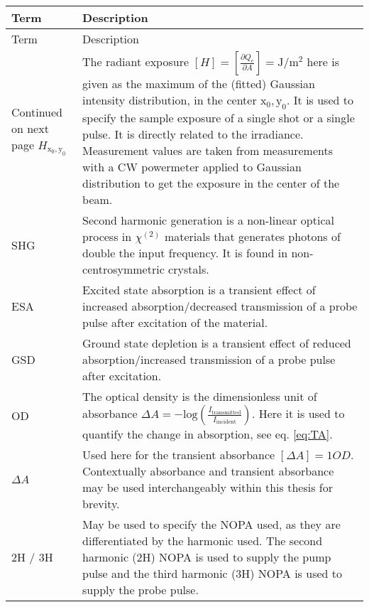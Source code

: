 \documentclass[twoside,openright,listof=numbered]{scrreprt}
\def\radiantExp{\ensuremath{H_\mathrm{x_0,y_0}}}
\begin{document}
\begin{longtable}{p{}p{}}
    \toprule 
    Term & Description \\
    \midrule
    \endfirsthead
    \toprule 
    Term & Description \\
    \midrule
    \endhead
    \midrule
    Continued on next page
    \endfoot
    \bottomrule
    \endlastfoot
\radiantExp & The radiant exposure $[H] = [\frac{\partial Q_e}{\partial A}] = \si{\joule\per\square\meter}$ here is given as the maximum of the (fitted) Gaussian intensity distribution, in the center $\mathrm{x_0,y_0}$. It is used to specify the sample exposure of a single shot or a single pulse. It is directly related to the irradiance. Measurement values are taken from measurements with a CW powermeter applied to Gaussian distribution to get the exposure in the center of the beam.\\
SHG & Second harmonic generation is a non-linear optical process in $\chi^{\left(2\right)}$ materials that generates photons of double the input frequency. It is found in non-centrosymmetric crystals.\\
ESA & Excited state absorption is a transient effect of increased absorption/decreased transmission of a probe pulse after excitation of the material.\\
GSD & Ground state depletion is a transient effect of reduced absorption/increased transmission of a probe pulse after excitation.\\
OD & The optical density is the dimensionless unit of absorbance $\Delta A = -\text{log}\left(\frac{I_\text{transmitted}}{I_\text{incident}}\right)$. Here it is used to quantify the change in absorption, see eq. \ref{eq:TA}.\\
$\Delta A$& Used here for the transient absorbance $[\Delta A] = 1 OD$. Contextually absorbance and transient absorbance may be used interchangeably within this thesis for brevity.\\
2H / 3H & May be used to specify the NOPA used, as they are differentiated by the harmonic used. The second harmonic (2H) NOPA is used to supply the pump pulse and the third harmonic (3H) NOPA is used to supply the probe pulse.\\
\bottomrule
\end{longtable}
\end{document}
